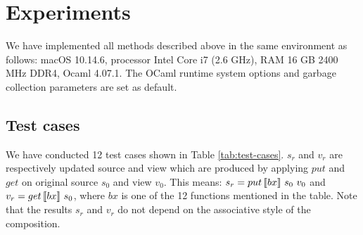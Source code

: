 \section{Experiments}

We have implemented all methods described above in the same environment as follows: macOS 10.14.6, processor Intel Core i7 (2.6 GHz), RAM 16 GB 2400 MHz DDR4, Ocaml 4.07.1. The OCaml runtime system options and garbage collection parameters are set as default.

\subsection{Test cases}

We have conducted 12 test cases shown in Table \ref{tab:test-cases}. $s_r$ and $v_r$ are respectively updated source and view which are produced by applying $put$ and $get$ on original source $s_0$ and view $v_0$. This means: $s_r = put \, [\![bx]\!] \ s_0 \ v_0$ and $v_r = get \, [\![bx]\!] \ s_0$, where $bx$ is one of the 12 functions mentioned in the table. Note that the results $s_r$ and $v_r$ do not depend on the associative style of the composition.

